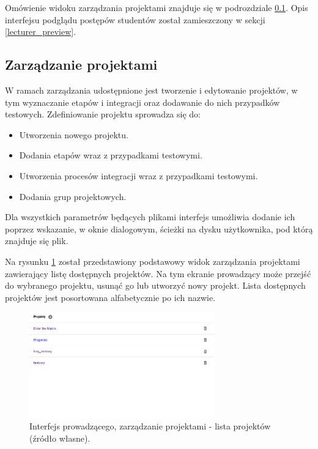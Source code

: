 Omówienie widoku zarządzania projektami znajduje się w podrozdziale \ref{lecturer-management}.
Opis interfejsu podglądu postępów studentów został zamieszczony w sekcji \ref{lecturer_preview}.

\subsection{Zarządzanie projektami}
\label{lecturer-management}

W ramach zarządzania udostępnione jest tworzenie i edytowanie projektów, w tym wyznaczanie etapów i integracji oraz dodawanie do nich przypadków testowych.
Zdefiniowanie projektu sprowadza się do:
\begin {itemize}
    \item Utworzenia nowego projektu.
    \item Dodania etapów wraz z przypadkami testowymi.
    \item Utworzenia procesów integracji wraz z przypadkami testowymi.
    \item Dodania grup projektowych.
\end {itemize}

Dla wszystkich parametrów będących plikami interfejs umożliwia dodanie ich poprzez wskazanie, w oknie dialogowym, ścieżki na dysku użytkownika, pod którą znajduje się plik.

Na rysunku \ref{fig:lecturer_projects_list} został przedstawiony podstawowy widok zarządzania projektami zawierający listę dostępnych projektów.
Na tym ekranie prowadzący może przejść do wybranego projektu, usunąć go lub utworzyć nowy projekt.
Lista dostępnych projektów jest posortowana alfabetycznie po ich nazwie.

\begin{figure}[h]
    \centering
    \includegraphics[width = 8cm]{chapter04/lecturer_projects_list.png}
    \caption{Interfejs prowadzącego, zarządzanie projektami - lista projektów (źródło własne).}
    \label{fig:lecturer_projects_list}
\end{figure}

